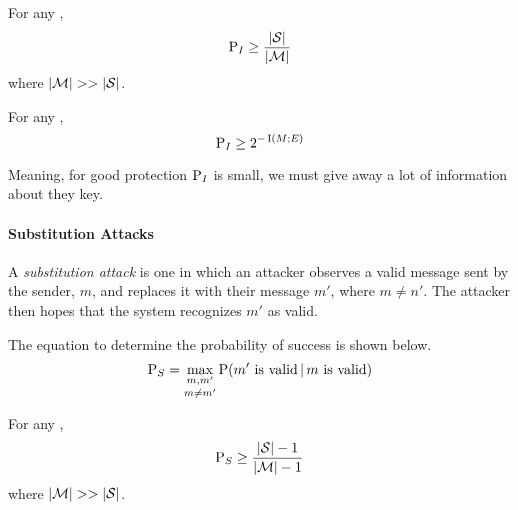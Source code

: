 \begin{theorem}\label{thm:Attack_Authentication_Code-Impersonation-Success_Bounds}
  For any ,
  \begin{equation}\label{eq:Attack_Authentication_Code-Impersonation-Success_Bound}
    \operatorname{\operatorname{P}}_{I} \geq \frac{\lvert \operatorname{\mathcal{S}} \rvert}{\lvert \operatorname{\mathcal{M}} \rvert}
  \end{equation}
  where $\lvert \operatorname{\mathcal{M}} \rvert >> \lvert \operatorname{\mathcal{S}} \rvert$.
\end{theorem}

\begin{theorem}\label{thm:Impersonation-Simmons_Bound}
  For any ,
  \begin{equation}\label{eq:Impersonation-Simmons_Bound}
    \operatorname{\operatorname{P}}_{I} \geq 2^{-\operatorname{\operatorname{I}}(M; E)}
  \end{equation}

  Meaning, for good protection $\operatorname{\operatorname{P}}_{I}$ is small, we must give away a lot of information about they key.
\end{theorem}

\paragraph{Substitution Attacks}\label{par:Attack_Authentication_Code-Substitution}
\begin{definition}\label{def:Attack_Authentication_Code-Substitution}
  A \emph{substitution attack} is one in which an attacker observes a valid message sent by the sender, $m$, and replaces it with their message $m'$, where $m \neq n'$.
  The attacker then hopes that the system recognizes $m'$ as valid.

  The equation to determine the probability of success is shown below.
  \begin{equation}\label{eq:Attack_Authentication_Code-Substitution-Success}
    \operatorname{\operatorname{P}}_{S} = \underset{m \neq m'}{\max_{m,m'}} \operatorname{\operatorname{P}}(m' \text{ is valid} \operatorname{\vert} m \text{ is valid})
  \end{equation}
\end{definition}

\begin{theorem}\label{thm:Attack_Authentication_Code-Substitution-Success_Bounds}
  For any ,
  \begin{equation}\label{eq:Attack_Authentication_Code-Substitution-Success_Bound}
    \operatorname{\operatorname{P}}_{S} \geq \frac{\lvert \operatorname{\mathcal{S}} \rvert - 1}{\lvert \operatorname{\mathcal{M}} \rvert - 1}
  \end{equation}
  where $\lvert \operatorname{\mathcal{M}} \rvert >> \lvert \operatorname{\mathcal{S}} \rvert$.
\end{theorem}

